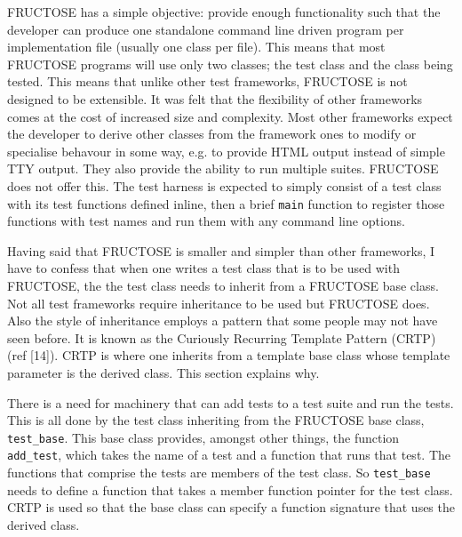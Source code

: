 \documentclass{book}
\begin{document}

FRUCTOSE has a simple objective: provide enough functionality such that the
developer can produce one standalone command line driven program per
implementation file (usually one class per file). This means that most
FRUCTOSE programs will use only two classes; the test class and the class
being tested. This means that unlike other test frameworks, FRUCTOSE is not
designed to be extensible.  It was felt that the flexibility of other
frameworks comes at the cost of increased size and complexity. Most other
frameworks expect the developer to derive other classes from the framework
ones to modify or specialise behavour in some way, e.g. to provide HTML output
instead of simple TTY output. They also provide the ability to run multiple
suites. FRUCTOSE does not offer this. The test harness is expected to simply
consist of a test class with its test functions defined inline, then a brief
{\tt main} function to register those functions with test names and run them
with any command line options.


Having said that FRUCTOSE is smaller and simpler than other frameworks,
I have to confess that when one writes a test class that is to be used
with FRUCTOSE, the the test class needs to inherit from a FRUCTOSE base
class. Not all test frameworks require inheritance to be used but
FRUCTOSE does. Also the style of inheritance employs a pattern that
some people may not have seen before.
It is known as the Curiously Recurring Template
Pattern (CRTP) (ref [14]).  CRTP is where one inherits from a 
template base class whose template parameter is the derived class.
This section explains why.

There is a need for machinery that can add tests to a test suite and run the
tests. This is all done by the test class inheriting from the FRUCTOSE base
class, {\tt test\_base}. This base class provides, amongst other things, 
the function {\tt add\_test}, which takes the name of a test and a function
that runs that test. 
The functions that comprise the tests are members of the test class.
So {\tt test\_base} needs to define a function that takes a member function 
pointer for the test class.
CRTP is used so that the base class can
specify a function signature that uses the derived class.
\end{document}
